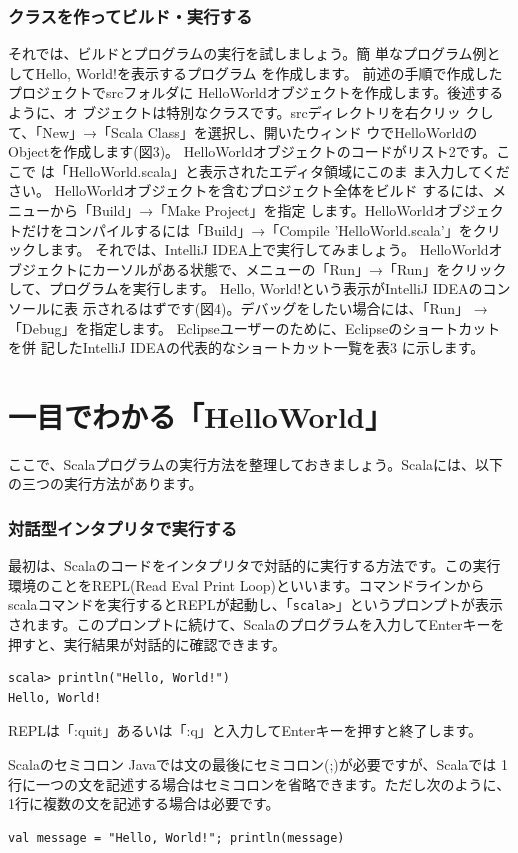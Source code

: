 \documentclass[10pt]{jarticle}
\begin{document}
\section{クラスを作ってビルド・実行する}
それでは、ビルドとプログラムの実行を試しましょう。簡 単なプログラム例としてHello, World!を表示するプログラム を作成します。 前述の手順で作成したプロジェクトでsrcフォルダに HelloWorldオブジェクトを作成します。後述するように、オ ブジェクトは特別なクラスです。srcディレクトリを右クリッ クして、「New」→「Scala Class」を選択し、開いたウィンド ウでHelloWorldのObjectを作成します(図3)。 HelloWorldオブジェクトのコードがリスト2です。ここで は「HelloWorld.scala」と表示されたエディタ領域にこのま ま入力してください。 HelloWorldオブジェクトを含むプロジェクト全体をビルド するには、メニューから「Build」→「Make Project」を指定 します。HelloWorldオブジェクトだけをコンパイルするには「Build」→「Compile 'HelloWorld.scala'」をクリックします。 それでは、IntelliJ IDEA上で実行してみましょう。 HelloWorldオブジェクトにカーソルがある状態で、メニューの「Run」→「Run」をクリックして、プログラムを実行します。 Hello, World!という表示がIntelliJ IDEAのコンソールに表 示されるはずです(図4)。デバッグをしたい場合には、「Run」 →「Debug」を指定します。 Eclipseユーザーのために、Eclipseのショートカットを併 記したIntelliJ IDEAの代表的なショートカット一覧を表3 に示します。

\part{一目でわかる「HelloWorld」}
ここで、Scalaプログラムの実行方法を整理しておきましょう。Scalaには、以下の三つの実行方法があります。 
\setcounter{section}{0}

\section{対話型インタプリタで実行する}
最初は、Scalaのコードをインタプリタで対話的に実行する方法です。この実行環境のことをREPL(Read Eval Print Loop)といいます。コマンドラインからscalaコマンドを実行するとREPLが起動し、「\verb|scala>|」というプロンプトが表示されます。このプロンプトに続けて、Scalaのプログラムを入力してEnterキーを押すと、実行結果が対話的に確認できます。 
\begin{verbatim}
scala> println("Hello, World!")
Hello, World!
\end{verbatim}
REPLは「:quit」あるいは「:q」と入力してEnterキーを押すと終了します。

\begin{itembox}[l]{Scalaのセミコロン}
Javaでは文の最後にセミコロン(;)が必要ですが、Scalaでは 1行に一つの文を記述する場合はセミコロンを省略できます。ただし次のように、1行に複数の文を記述する場合は必要です。
\begin{verbatim}
val message = "Hello, World!"; println(message)
\end{verbatim}
\end{itembox}
\end{document}
